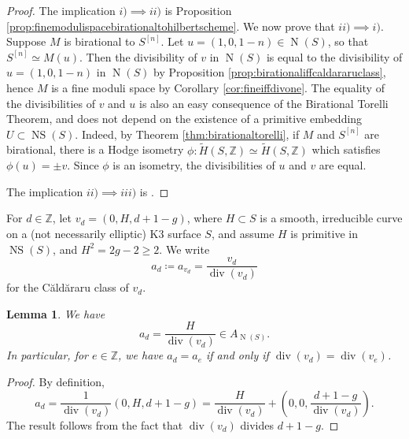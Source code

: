 \documentclass[11pt,twoside]{amsart}
\numberwithin{equation}{section}
\newtheorem{lemma}[dummy]{Lemma}
\theoremstyle{definition}
\theoremstyle{plain}
\newcommand{\Z}{\ensuremath{\mathbb{Z}}}
\def\NS{\operatorname{NS}}
\def\N{\operatorname{N}}
\def\dv{\operatorname{div}}
\begin{document}
\begin{proof}
    The implication $i)\implies ii)$ is Proposition \ref{prop:finemodulispacebirationaltohilbertscheme}. 
    We now prove that $ii)\implies i).$
    Suppose $M$ is birational to $S^{[n]}$. Let $u = (1,0,1-n)\in \N(S)$, so that $S^{[n]}\simeq M(u)$. Then the divisibility of $v$ in $\N(S)$ is equal to the divisibility of $u=(1,0,1-n)$ in $\N(S)$ by Proposition \ref{prop:birationaliffcaldararuclass}, hence $M$ is a fine moduli space by Corollary \ref{cor:fineiffdivone}. The equality of the divisibilities of $v$ and $u$ is also an easy consequence of the Birational Torelli Theorem, and does not depend on the existence of a primitive embedding $U\subset \NS(S)$. Indeed, by Theorem \ref{thm:birationaltorelli}, if $M$ and $S^{[n]}$ are birational, there is a Hodge isometry $\phi: \tilde{H}(S,\Z)\simeq \tilde{H}(S,\Z)$ which satisfies $\phi(u) = \pm v$. Since $\phi$ is an isometry, the divisibilities of $u$ and $v$ are equal. 

The implication $ii)\implies iii)$ is \cite{Hal21}.
\end{proof}








For $d\in \Z$, let $v_d=(0,H,d+1-g)$, where $H\subset S$ is a smooth, irreducible curve on a (not necessarily elliptic) K3 surface $S$, and assume $H$ is primitive in $\NS(S)$, and $H^2 = 2g-2\geq 2$. We write $$a_d\coloneqq a_{v_d}=\frac{v_d}{\dv(v_d)}$$ for the C\u ald\u araru class of $v_d$.  


\begin{lemma}\label{lem:caldararuclassbm}
    We have $$a_d = \frac{H}{\dv(v_d)}\in A_{\N(S)}.$$ In particular, for $e\in \Z$, we have $a_d=a_e$ if and only if $\dv(v_d) = \dv(v_e)$.
\end{lemma}
\begin{proof}
    By definition, $$a_d = \frac{1}{\dv(v_d)}(0,H,d+1-g)=\frac{H}{\dv(v_d)} + (0,0,\frac{d+1-g}{\dv(v_d)}).$$ The result follows from the fact that $\dv(v_d)$ divides $d+1-g$. 
\end{proof}
\end{document}
